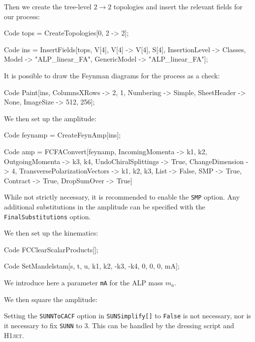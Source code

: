 \documentclass[12pt]{article}
\begin{document}
Then we create the tree-level $2 \rightarrow 2$ topologies and insert
the relevant fields for our process:
\begin{mmaCell}{Code}
tops = CreateTopologies[0, 2 -> 2];
\end{mmaCell}
\begin{mmaCell}{Code}
ins = InsertFields[tops, {V[4], V[4]} -> {V[4], S[4]}, InsertionLevel -> {Classes}, Model -> "ALP_linear_FA", GenericModel -> "ALP_linear_FA"];
\end{mmaCell}
It is possible to draw the Feynman diagrams for the process as a check: 
\begin{mmaCell}{Code}
Paint[ins, ColumnsXRows -> {2, 1}, Numbering -> Simple, SheetHeader -> None, 
      ImageSize -> {512, 256}]; 
\end{mmaCell}
We then set up the amplitude: 
\begin{mmaCell}{Code}
feynamp = CreateFeynAmp[ins];  
\end{mmaCell}
\begin{mmaCell}{Code}
amp = FCFAConvert[feynamp, IncomingMomenta -> {k1, k2}, OutgoingMomenta -> {k3, k4}, 
                  UndoChiralSplittings -> True, ChangeDimension -> 4, 
                  TransversePolarizationVectors -> {k1, k2, k3}, List -> False, 
                  SMP -> True, Contract -> True, DropSumOver -> True] 
\end{mmaCell}
While not strictly necessary, it is recommended to enable the \texttt{SMP} option. Any additional substitutions in the amplitude can be specified with the \texttt{FinalSubstitutions} option. 

We then set up the kinematics: 
\begin{mmaCell}{Code}
FCClearScalarProducts[]; 
\end{mmaCell}
\begin{mmaCell}{Code}
SetMandelstam[s, t, u, k1, k2, -k3, -k4, 0, 0, 0, mA]; 
\end{mmaCell}
We introduce here a parameter \texttt{mA} for the ALP mass $m_a$. 

We then square the amplitude: 
Setting the \texttt{SUNNToCACF} option in \texttt{SUNSimplify[]} to \texttt{False} is not necessary, nor is it necessary to fix \texttt{SUNN} to $3$. This can be handled by the dressing script and \textsc{H1jet}. 
\end{document}
